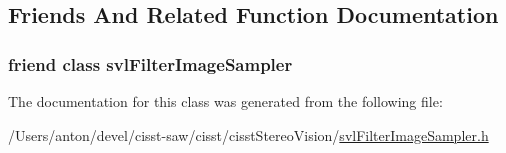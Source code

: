 \subsection{Friends And Related Function Documentation}
\hypertarget{classsvl_image_sampler_callback_base_a4f292ca39b01a4b78066fa6da1d081d4}{}
\subsubsection[{svl\+Filter\+Image\+Sampler}]{\setlength{\rightskip}{0pt plus 5cm}friend class {\bf svl\+Filter\+Image\+Sampler}\hspace{0.3cm}{\ttfamily [friend]}}\label{classsvl_image_sampler_callback_base_a4f292ca39b01a4b78066fa6da1d081d4}


The documentation for this class was generated from the following file\+:\begin{DoxyCompactItemize}
\item 
/\+Users/anton/devel/cisst-\/saw/cisst/cisst\+Stereo\+Vision/\hyperlink{svl_filter_image_sampler_8h}{svl\+Filter\+Image\+Sampler.\+h}\end{DoxyCompactItemize}
